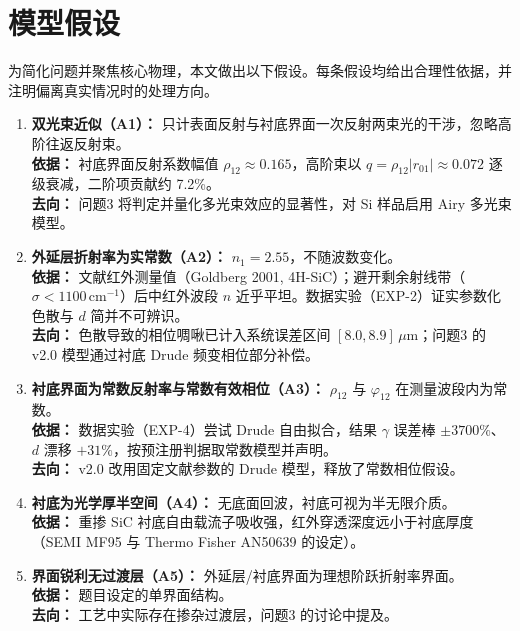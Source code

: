 \section{模型假设}

为简化问题并聚焦核心物理，本文做出以下假设。每条假设均给出合理性依据，并注明偏离真实情况时的处理方向。

\begin{enumerate}[itemindent=2em]
\item \textbf{双光束近似（A1）：} 只计表面反射与衬底界面一次反射两束光的干涉，忽略高阶往返反射束。\\
\textbf{依据：} 衬底界面反射系数幅值 $\rho_{12}\approx0.165$，高阶束以 $q=\rho_{12}|r_{01}|\approx0.072$ 逐级衰减，二阶项贡献约 7.2\%。\\
\textbf{去向：} 问题3 将判定并量化多光束效应的显著性，对 Si 样品启用 Airy 多光束模型。

\item \textbf{外延层折射率为实常数（A2）：} $n_1=2.55$，不随波数变化。\\
\textbf{依据：} 文献红外测量值（Goldberg 2001, 4H-SiC）；避开剩余射线带（$\sigma<1100$\,cm$^{-1}$）后中红外波段 $n$ 近乎平坦。数据实验（EXP-2）证实参数化色散与 $d$ 简并不可辨识。\\
\textbf{去向：} 色散导致的相位啁啾已计入系统误差区间 $[8.0,8.9]\,\mu$m；问题3 的 v2.0 模型通过衬底 Drude 频变相位部分补偿。

\item \textbf{衬底界面为常数反射率与常数有效相位（A3）：} $\rho_{12}$ 与 $\varphi_{12}$ 在测量波段内为常数。\\
\textbf{依据：} 数据实验（EXP-4）尝试 Drude 自由拟合，结果 $\gamma$ 误差棒 $\pm3700\%$、$d$ 漂移 $+31\%$，按预注册判据取常数模型并声明。\\
\textbf{去向：} v2.0 改用固定文献参数的 Drude 模型，释放了常数相位假设。

\item \textbf{衬底为光学厚半空间（A4）：} 无底面回波，衬底可视为半无限介质。\\
\textbf{依据：} 重掺 SiC 衬底自由载流子吸收强，红外穿透深度远小于衬底厚度（SEMI MF95 与 Thermo Fisher AN50639 的设定）。

\item \textbf{界面锐利无过渡层（A5）：} 外延层/衬底界面为理想阶跃折射率界面。\\
\textbf{依据：} 题目设定的单界面结构。\\
\textbf{去向：} 工艺中实际存在掺杂过渡层，问题3 的讨论中提及。


\end{enumerate}

